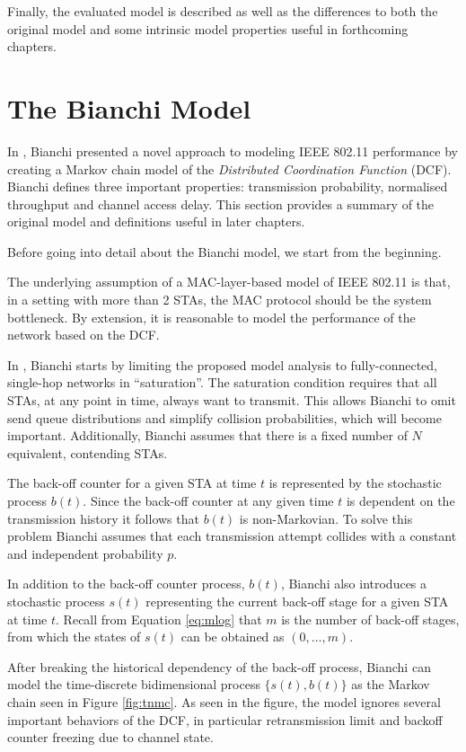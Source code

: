 Finally, the evaluated model \cite{felemban} is described as well as the
differences to both the original model \cite{bianchi} and some intrinsic model
properties useful in forthcoming chapters.

\section{The Bianchi Model}

In \cite{bianchi}, Bianchi presented a novel approach to modeling IEEE 802.11
performance by creating a Markov chain model of the \emph{Distributed
Coordination Function} (DCF). Bianchi defines three important properties:
transmission probability, normalised throughput and channel access delay. This
section provides a summary of the original model and definitions useful in
later chapters.

Before going into detail about the Bianchi model, we start from the beginning.

The underlying assumption of a MAC-layer-based model of IEEE 802.11 is that,
in a setting with more than 2 STAs, the MAC protocol should be the system
bottleneck. By extension, it is reasonable to model the performance of the
network based on the DCF.

In \cite{bianchi}, Bianchi starts by limiting the proposed model analysis to
fully-connected, single-hop networks in ``saturation''. The saturation
condition requires that all STAs, at any point in time, always want to
transmit. This allows Bianchi to omit send queue distributions and simplify
collision probabilities, which will become important. Additionally, Bianchi
assumes that there is a fixed number of $N$ equivalent, contending STAs.

The back-off counter for a given STA at time $t$ is represented by the
stochastic process $b(t)$. Since the back-off counter at any given time $t$ is
dependent on the transmission history it follows that $b(t)$ is non-Markovian.
To solve this problem Bianchi assumes that each transmission attempt collides
with a constant and independent probability $p$.

In addition to the back-off counter process, $b(t)$, Bianchi also introduces a
stochastic process $s(t)$ representing the current back-off stage for a given
STA at time $t$. Recall from Equation \ref{eq:mlog} that $m$ is the number of
back-off stages, from which the states of $s(t)$ can be obtained as $(0,
\dots, m)$.

After breaking the historical dependency of the back-off process, Bianchi can
model the time-discrete bidimensional process $\{s(t), b(t)\}$ as the Markov
chain seen in Figure \ref{fig:tnmc}. As seen in the figure, the model ignores
several important behaviors of the DCF, in particular retransmission limit and
backoff counter freezing due to channel state.

